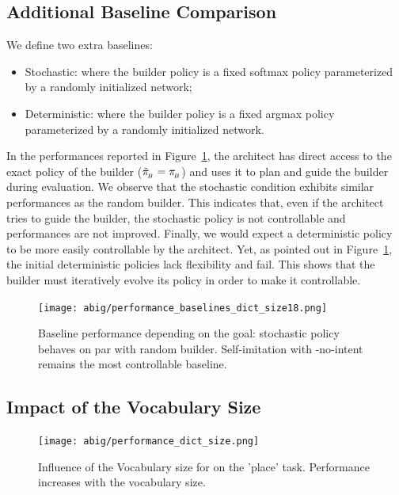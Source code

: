 \subsection{Additional Baseline Comparison}
\label{ap:baselines}
We define two extra baselines: 
\begin{itemize}[noitemsep]
    \item Stochastic: where the builder policy is a fixed softmax policy parameterized by a randomly initialized network;
    \item Deterministic: where the builder policy is a fixed argmax policy parameterized by a randomly initialized network.
\end{itemize}
In the performances reported in Figure~\ref{fig:baseline_performance}, the architect has direct access to the exact policy of the builder ($\tilde{\pi}_{\!_B}=\pi_{\!_B}$) and uses it to plan and guide the builder during evaluation.  We observe that the stochastic condition exhibits similar performances as the random builder. This indicates that, even if the architect tries to guide the builder, the stochastic policy is not controllable and performances are not improved. Finally, we would expect a deterministic policy to be more easily controllable by the architect. Yet, as pointed out in Figure~\ref{fig:baseline_performance}, the initial deterministic policies lack flexibility and fail. This shows that the builder must iteratively evolve its policy in order to make it controllable.

\begin{figure}[h!]
    \centering
    \texttt{[image: abig/performance\_baselines\_dict\_size18.png]}
    \caption{Baseline performance depending on the goal: stochastic policy behaves on par with random builder. Self-imitation with \abig-no-intent remains the most controllable baseline.}
    \label{fig:baseline_performance}
\end{figure}
\subsection{Impact of the Vocabulary Size}
\label{sup:sec_res_dict_size}
\begin{figure}[h!]
    \centering
    \texttt{[image: abig/performance\_dict\_size.png]}
    \caption{Influence of the Vocabulary size for \abig on the 'place' task. Performance increases with the vocabulary size.}
    \label{fig:dict_size_performance}
\end{figure}



